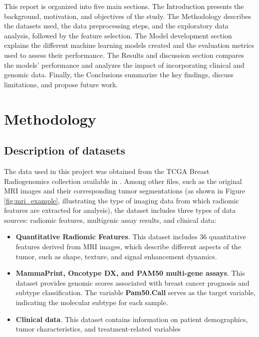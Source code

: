 \documentclass[conference]{IEEEtran}
\begin{document}
This report is organized into five main sections. The Introduction presents the background, motivation, and objectives of the study. The Methodology describes the datasets used, the data preprocessing steps, and the exploratory data analysis, followed by the feature selection. The Model development section explains the different machine learning models created and the evaluation metrics used to assess their performance. The Results and discussion section compares the models' performance and analyzes the impact of incorporating clinical and genomic data. Finally, the Conclusions summarize the key findings, discuss limitations, and propose future work.


\section{Methodology}

\subsection{Description of datasets}


The data used in this project was obtained from the TCGA Breast Radiogenomics collection available in \cite{b3}. Among other files, such as the original MRI images and their corresponding tumor segmentations (as shown in Figure \ref{fig:mri_example}, illustrating the type of imaging data from which radiomic features are extracted for analysis), the dataset includes three types of data sources: radiomic features, multigenic assay results, and clinical data:

\begin{itemize}
	\item \textbf{Quantitative Radiomic Features}.  This dataset includes 36 quantitative features derived from MRI images, which describe different aspects of the tumor, such as shape, texture, and signal enhancement dynamics.

	\item \textbf{MammaPrint, Oncotype DX, and PAM50 multi-gene assays}. This dataset provides genomic scores associated with breast cancer prognosis and subtype classification. The variable \textbf{Pam50.Call} serves as the target variable, indicating the molecular subtype for each sample.

	\item \textbf{Clinical data}. This dataset contains information on patient demographics, tumor characteristics, and treatment-related variables

\end{itemize}
\end{document}
